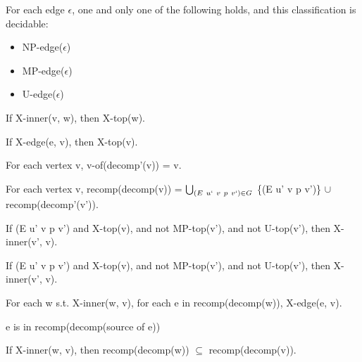 \documentclass[acmsmall,dvipsnames,10pt,review,anonymous]{acmart}\settopmatter{printfolios=true}
\newcommand{\edgevar}[0]{\ensuremath{\epsilon}}
\newcommand{\set}[1]{\{#1\}}
\begin{document}
\begin{corollary}
\label{cor:edge-class}
    For each edge \edgevar, one and only one of the following holds, and this classification is decidable:
\begin{itemize}
    \item NP-edge(\edgevar)
    \item MP-edge(\edgevar) 
    \item U-edge(\edgevar)
\end{itemize}
\end{corollary}

\begin{lemma}
    If X-inner(v, w), then X-top(w).
\end{lemma}

\begin{lemma}
    If X-edge(e, v), then X-top(v).
\end{lemma}

\begin{lemma}
    For each vertex v, v-of(decomp’(v)) = v.
\end{lemma}

\begin{lemma}
\label{lem:redecomp-eq}
    For each vertex v, recomp(decomp(v)) = $\bigcup_{(E\ u`\ v\ p\ v`) \in G}$ \set{(E u’ v p v’)} $\cup$ recomp(decomp’(v’)).
\end{lemma}

\begin{lemma}
\label{lem:parent-top-inner}
    If (E u’ v p v’) and X-top(v), and not MP-top(v’), and not U-top(v’), then X-inner(v’, v).
\end{lemma}

\begin{lemma}
\label{lem:parent-inner-inner}
    If (E u’ v p v’) and X-top(v), and not MP-top(v’), and not U-top(v’), then X-inner(v’, v).
\end{lemma}

\begin{lemma}
\label{lem:redecomp-side1}
    For each w s.t. X-inner(w, v), for each e in recomp(decomp(w)), X-edge(e, v).
\end{lemma}

\begin{lemma}
\label{lem:redecomp-source}
    e is in recomp(decomp(source of e))
\end{lemma}

\begin{lemma}
\label{lem:redecomp-side2}
    If X-inner(w, v), then recomp(decomp(w)) $\subseteq$ recomp(decomp(v)). 
\end{lemma}
\end{document}
